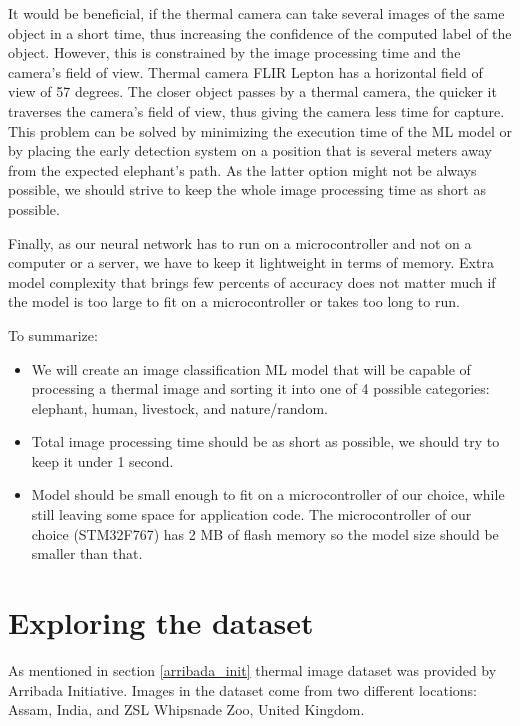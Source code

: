 It would be beneficial, if the thermal camera can take several images of the same object in a short time, thus increasing the confidence of the computed label of the object.
However, this is constrained by the image processing time and the camera's field of view.
Thermal camera FLIR Lepton has a horizontal field of view of 57 degrees.
The closer object passes by a thermal camera, the quicker it traverses the camera's field of view, thus giving the camera less time for capture.
This problem can be solved by minimizing the execution time of the ML model or by placing the early detection system on a position that is several meters away from the expected elephant's path.
As the latter option might not be always possible, we should strive to keep the whole image processing time as short as possible.

Finally, as our neural network has to run on a microcontroller and not on a computer or a server, we have to keep it lightweight in terms of memory.
Extra model complexity that brings few percents of accuracy does not matter much if the model is too large to fit on a microcontroller or takes too long to run.

To summarize:

\begin{itemize}
    \item We will create an image classification ML model that will be capable of processing a thermal image and sorting it into one of 4 possible categories: elephant, human, livestock, and nature/random.
    \item Total image processing time should be as short as possible, we should try to keep it under 1 second.
    \item Model should be small enough to fit on a microcontroller of our choice, while still leaving some space for application code. The microcontroller of our choice (STM32F767) has 2 MB of flash memory so the model size should be smaller than that.
\end{itemize}


\section{ Exploring the dataset} \label{exploring_dataset}

As mentioned in section \ref{arribada_init} thermal image dataset was provided by Arribada Initiative\cite{wildlabs-winners}\cite{arribada-assam}.
Images in the dataset come from two different locations: Assam, India, and ZSL Whipsnade Zoo, United Kingdom.

